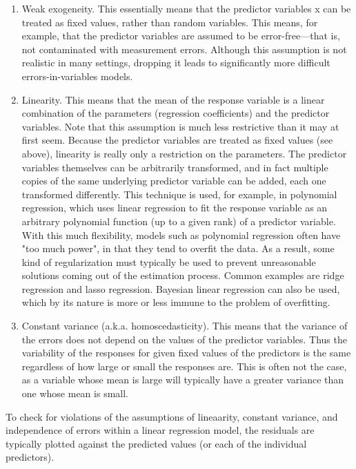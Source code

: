 \begin{enumerate}
    \item Weak exogeneity. This essentially means that the predictor variables x 
		can be treated as fixed values, rather than random variables. 
		This means, for example, that the predictor variables are assumed to be error-free—that 
		is, not contaminated with measurement errors. 
		Although this assumption is not realistic in many settings, dropping it leads to
		significantly more difficult errors-in-variables models.
    \item Linearity. This means that the mean of the response variable is a linear combination 
		of the parameters (regression coefficients) and the predictor variables.
		Note that this assumption is much less restrictive than it may at first seem. 
		Because the predictor variables are treated as fixed values (see above), linearity is
		really only a restriction on the parameters. 
		The predictor variables themselves can be arbitrarily transformed, and in fact multiple
		copies of the same underlying predictor variable can be added, each one transformed 
		differently. This technique is used, for example, in polynomial regression, 
		which uses linear regression to fit the response variable as an arbitrary polynomial 
		function (up to a given rank) of a predictor variable.
		With this much flexibility, models such as polynomial regression often have
		"too much power", in that they tend to overfit the data. As a result,
		some kind of regularization must typically be used to prevent unreasonable solutions
		coming out of the estimation process. 
		Common examples are ridge regression and lasso regression. Bayesian linear regression 
		can also be used, which by its nature is more or 
		less immune to the problem of overfitting.
    \item Constant variance (a.k.a. homoscedasticity). This means that the variance of 
		the errors does not depend on the values of the predictor variables.
		Thus the variability of the responses for given fixed values of the predictors is the
		same regardless of how large or small the responses are. 
		This is often not the case, as a variable whose mean is large will typically have a 
		greater variance than one whose mean is small.
\end{enumerate}
To check for violations of the assumptions of lineaarity, constant variance, and independence
of errors within a linear regression model, the residuals are typically plotted against the 
predicted values (or each of the individual predictors). 
